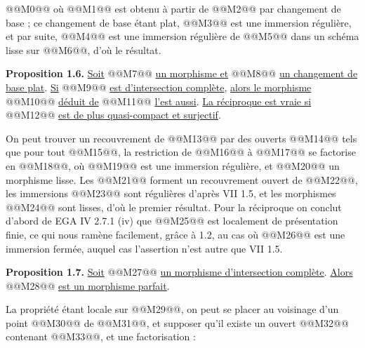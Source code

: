 
@@M0@@
où @@M1@@ est obtenu à partir de @@M2@@ par changement de base ; ce changement de base étant plat, @@M3@@ est une immersion régulière, et par suite, @@M4@@ est une immersion régulière de @@M5@@ dans un schéma lisse sur @@M6@@, d'où le résultat.

\textbf{Proposition 1.6.} \uline{Soit} @@M7@@ \uline{un morphisme et} @@M8@@ \uline{un changement de base plat}. \uline{Si} @@M9@@ \uline{est d'intersection complète}, \uline{alors le morphisme} @@M10@@ \uline{déduit de} @@M11@@ \uline{l'est aussi}. \uline{La réciproque est vraie si} @@M12@@ \uline{est de plus quasi-compact et surjectif}.

On peut trouver un recouvrement de @@M13@@ par des ouverts @@M14@@ tels que pour tout @@M15@@, la restriction de @@M16@@ à @@M17@@ se factorise en @@M18@@, où @@M19@@ est une immersion régulière, et @@M20@@ un morphisme lisse. Les @@M21@@ forment un recouvrement ouvert de @@M22@@, les immersions @@M23@@ sont régulières d'après VII 1.5, et les morphismes @@M24@@ sont lisses, d'où le premier résultat. Pour la réciproque on conclut d'abord de EGA IV 2.7.1 (iv) que @@M25@@ est localement de présentation finie, ce qui nous ramène facilement, grâce à 1.2, au cas où @@M26@@ est une immersion fermée, auquel cas l'assertion n'est autre que VII 1.5.

\textbf{Proposition 1.7.} \uline{Soit} @@M27@@ \uline{un morphisme d'intersection complète}. \uline{Alors} @@M28@@ \uline{est un morphisme parfait}.

La propriété étant locale sur @@M29@@, on peut se placer au voisinage d'un point @@M30@@ de @@M31@@, et supposer qu'il existe un ouvert @@M32@@ contenant @@M33@@, et une factorisation :
